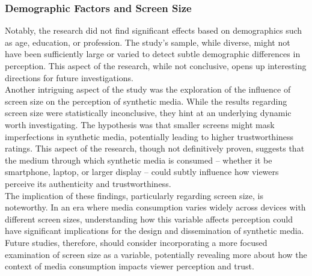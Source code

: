 \documentclass[
  a4paper,  %
  twoside,  %
  bibliography=totoc,
  headsepline,
  cleardoublepage=empty,
  parskip=half,
  draft=false
]{scrbook}
\begin{document}
\subsubsection{Demographic Factors and Screen Size}
Notably, the research did not find significant effects based on demographics such as age, education, or profession. The study's sample, while diverse, might not have been sufficiently large or varied to detect subtle demographic differences in perception. This aspect of the research, while not conclusive, opens up interesting directions for future investigations. \\
Another intriguing aspect of the study was the exploration of the influence of screen size on the perception of synthetic media. While the results regarding screen size were statistically inconclusive, they hint at an underlying dynamic worth investigating. The hypothesis was that smaller screens might mask imperfections in synthetic media, potentially leading to higher trustworthiness ratings. This aspect of the research, though not definitively proven, suggests that the medium through which synthetic media is consumed – whether it be smartphone, laptop, or larger display – could subtly influence how viewers perceive its authenticity and trustworthiness. \\
The implication of these findings, particularly regarding screen size, is noteworthy. In an era where media consumption varies widely across devices with different screen sizes, understanding how this variable affects perception could have significant implications for the design and dissemination of synthetic media. Future studies, therefore, should consider incorporating a more focused examination of screen size as a variable, potentially revealing more about how the context of media consumption impacts viewer perception and trust.
\end{document}
